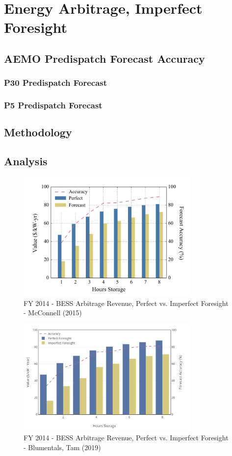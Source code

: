 \chapter{ Energy Arbitrage, Imperfect Foresight }
\section{ AEMO Predispatch Forecast Accuracy }
\subsection{ P30 Predispatch Forecast  }
\subsection{ P5 Predispatch Forecast  }
\section{ Methodology }
\section{ Analysis }
\begin{center}
\begin{figure}[!h]
  \caption{FY 2014 - BESS Arbitrage Revenue, Perfect vs. Imperfect Foresight - McConnell (2015)}
  \centering
\includegraphics[width=0.8\textwidth]{Pictures/Chapter4/2014_Comp_McCon.png}
\end{figure}
\begin{figure}[!h]
  \caption{FY 2014 - BESS Arbitrage Revenue, Perfect vs. Imperfect Foresight - Blumentals, Tam (2019) }
  \centering
\includegraphics[width=0.8\textwidth]{Pictures/Chapter4/2014_Comp.png}
\end{figure}
\end{center}
